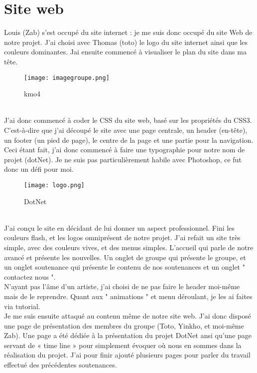 \documentclass{article}
\begin{document}
       \section{Site web}
Louis (Zab) s'est occupé du site internet : je me suis donc occupé du site Web de notre projet. J'ai choisi avec Thomas (toto) le logo du site internet ainsi que les couleurs dominantes. Jai ensuite commencé à visualiser le plan du site dans ma tête.\\
    \begin{figure}[hp]
	    \centering
	    \texttt{[image: imagegroupe.png]}
	    \caption{kmo4}
    \end{figure}
\\
J'ai donc commencé à coder le CSS du site web, basé sur les propriétés du CSS3. C'est-à-dire que j'ai découpé le site avec une page centrale, un header (en-tête), un footer (un pied de page), le centre de la page et une partie pour la navigation. Ceci étant fait, j'ai donc commencé à faire une typographie pour notre nom de projet (dotNet). Je ne suis pas particulièrement habile avec Photoshop, ce fut donc un défi pour moi.
    \begin{figure}[hp]
	    \centering
	    \texttt{[image: logo.png]}
	    \caption{DotNet}
    \end{figure}
\newpage
\\
J'ai conçu le site en décidant de lui donner un aspect professionnel. Fini les couleurs flash, et les logos omniprésent de notre projet. J’ai refait un site très simple, avec des couleurs vives, et des menus simples. L’accueil qui parle de notre avancé et présente les nouvelles. Un onglet de groupe qui présente le groupe, et un onglet soutenance qui présente le contenu de nos soutenances et un onglet " contactez nous ".\\
N’ayant pas l’âme d’un artiste, j’ai choisi de ne pas faire le header moi-même mais
de le reprendre. Quant aux " animations " et menu déroulant, je les ai faites via tutorial.\\

Je me suis ensuite attaqué au contenu même de notre site web. J'ai donc disposé une page de présentation des membres du groupe (Toto, Yinkho, et moi-même Zab). Une page a été dédiée à la présentation du projet DotNet ansi qu'une page servant de « time line » pour simplement évoquer où nous en sommes dans la réalisation du projet. J'ai pour finir ajouté plusieurs pages pour parler du travail effectué des précédentes soutenances.\\
\end{document}
